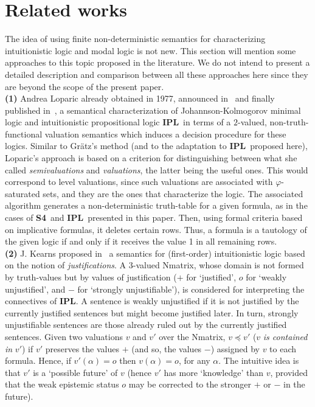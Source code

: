 \documentclass[12pt]{article}
\newcommand{\ipl}{\ensuremath{\mathbf{IPL}}}
\newcommand{\sfo}{\textbf{S4}}
\begin{document}
\section{Related works}\label{Sect:Related}

The idea of using finite non-deterministic semantics for characterizing intuitionistic logic and modal logic is not new. This section will mention some approaches to this topic proposed in the literature. We do not intend to present a detailed description and comparison between all these approaches here since they are beyond the scope of the present paper.\\[1mm]
{\bf(1)}  Andrea Loparic already obtained in 1977, announced in~\cite{loparic:77} and finally published in~\cite{loparic2010}, a semantical characterization of  Johannson-Kolmogorov minimal logic and intuitionistic propositional logic \ipl\ in terms of a $2$-valued, non-truth-functional valuation semantics which induces a decision procedure for these logics. Similar to Gr\"atz's method (and to the adaptation to  \ipl\ proposed here), Loparic's approach is based on a criterion for distinguishing between what she called {\em semivaluations} and {\em valuations}, the latter being the useful ones. This would correspond to level valuations, since such valuations are associated with $\varphi$-saturated sets, and they are the ones that characterize the logic. The associated algorithm generates a non-deterministic truth-table for a given formula, as in the cases of \sfo\ and \ipl\ presented in this paper. 
Then, using formal criteria based on implicative formulas, it deletes certain rows. Thus, a formula is a tautology of the given logic if and only if it receives the value 1 in all remaining rows.\\[1mm] %
{\bf(2)}  J. Kearns proposed in~\cite{kearns:78} a semantics for (first-order) intuitionistic logic based on the notion of {\em justifications}.
A 3-valued Nmatrix, whose domain is not formed by truth-values but by values of justification ($+$ for `justified', $o$ for `weakly unjustified', and $-$ for `strongly unjustifiable'), is considered for interpreting the connectives of \ipl. A sentence is weakly unjustified if it is not justified by the currently justified sentences but might become justified later. In turn, strongly unjustifiable sentences are those already ruled out by the currently justified sentences.
Given two valuations $v$ and $v'$ over the Nmatrix, $v \preceq v'$ ($v$ {\em is contained in} $v'$) if $v'$ preserves the values $+$ (and so, the values $-$) assigned by $v$ to each formula. Hence, if $v'(\alpha)=o$ then $v(\alpha)=o$, for any $\alpha$. The intuitive idea is that $v'$ is a `possible future' of $v$ (hence $v'$ has more `knowledge'  than $v$, provided that the weak epistemic status $o$ may be corrected to the stronger  $+$ or $-$ in the future).
\end{document}
